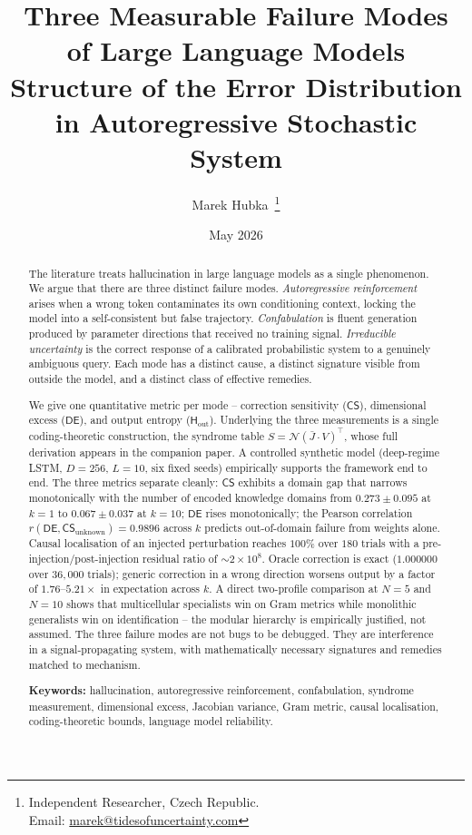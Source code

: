 \documentclass[11pt,a4paper]{article}
\title{%
  \textbf{Three Measurable Failure Modes\\of Large Language Models}\\[0.5em]
  \large Structure of the Error Distribution in Autoregressive Stochastic System
}
\author{Marek Hubka\, \orcidlink{0009-0003-2476-9017}
  \thanks{Independent Researcher, Czech Republic.\\
    Email: \href{mailto:marek@tidesofuncertainty.com}{marek@tidesofuncertainty.com}}}
\date{May 2026}
\newcommand{\CS}{\mathsf{CS}}
\newcommand{\DE}{\mathsf{DE}}
\newcommand{\Hout}{\mathsf{H}_{\mathrm{out}}}
\newcommand{\Jbar}{\bar{J}}
\newcommand{\Norm}{\mathcal{N}}
\begin{document}
\maketitle

\begin{abstract}
The literature treats hallucination in large language models as a single phenomenon. We argue that there are three distinct failure modes. \emph{Autoregressive reinforcement} arises when a wrong token contaminates its own conditioning context, locking the model into a self-consistent but false trajectory. \emph{Confabulation} is fluent generation produced by parameter directions that received no training signal. \emph{Irreducible uncertainty} is the correct response of a calibrated probabilistic system to a genuinely ambiguous query. Each mode has a distinct cause, a distinct signature visible from outside the model, and a distinct class of effective remedies.

We give one quantitative metric per mode -- correction sensitivity ($\CS$), dimensional excess ($\DE$), and output entropy ($\Hout$). Underlying the three measurements is a single coding-theoretic construction, the syndrome table $S = \Norm(\Jbar \cdot V)^\top$, whose full derivation appears in the companion paper. A controlled synthetic model (deep-regime LSTM, $D = 256$, $L = 10$, six fixed seeds) empirically supports the framework end to end. The three metrics separate cleanly: $\CS$ exhibits a domain gap that narrows monotonically with the number of encoded knowledge domains from $0.273 \pm 0.095$ at $k = 1$ to $0.067 \pm 0.037$ at $k = 10$; $\DE$ rises monotonically; the Pearson correlation $r(\DE, \CS_{\mathrm{unknown}}) = 0.9896$ across $k$ predicts out-of-domain failure from weights alone. Causal localisation of an injected perturbation reaches $100\%$ over $180$ trials with a pre-injection/post-injection residual ratio of $\sim 2 \times 10^8$. Oracle correction is exact ($1.000000$ over $36{,}000$ trials); generic correction in a wrong direction worsens output by a factor of $1.76$--$5.21\times$ in expectation across $k$. A direct two-profile comparison at $N = 5$ and $N = 10$ shows that multicellular specialists win on Gram metrics while monolithic generalists win on identification -- the modular hierarchy is empirically justified, not assumed. The three failure modes are not bugs to be debugged. They are interference in a signal-propagating system, with mathematically necessary signatures and remedies matched to mechanism.

\medskip
\noindent\textbf{Keywords:} hallucination, autoregressive reinforcement, confabulation, syndrome measurement, dimensional excess, Jacobian variance, Gram metric, causal localisation, coding-theoretic bounds, language model reliability.
\end{abstract}
\end{document}
